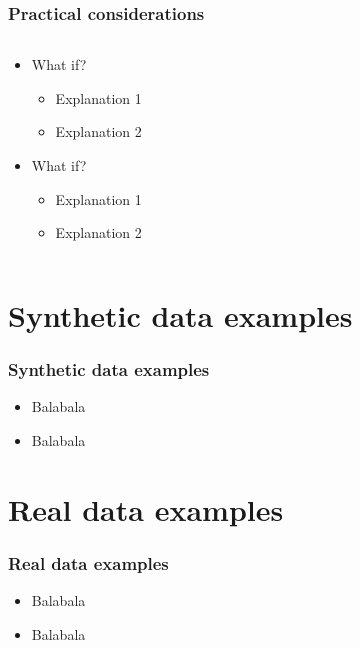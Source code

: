 \documentclass[]{beamer}
\begin{document}
\begin{frame}\frametitle{Practical considerations}
  \begin{columns}[T]
    \begin{column}{.6\textwidth}
     \begin{block}{}
\begin{center}
\begin{itemize}
\item What if?
\begin{itemize}
\item Explanation 1
\item Explanation 2
\end{itemize}
\item What if?
\begin{itemize}
\item Explanation 1
\item Explanation 2
\end{itemize}
\end{itemize}
\end{center}
    \end{block}
    \end{column}
    \begin{column}{.4\textwidth}
    \begin{block}{}
    \end{block}
    \end{column}
  \end{columns}
\end{frame} 

\section{Synthetic data examples}
\begin{frame}\frametitle{Synthetic data examples}
\begin{center}
\begin{itemize}
\item Balabala
\item Balabala
\end{itemize}
\end{center}
\end{frame}

\section{Real data examples}
\begin{frame}\frametitle{Real data examples}
\begin{center}
\begin{itemize}
\item Balabala
\item Balabala
\end{itemize}
\end{center}
\end{frame}
\end{document}
